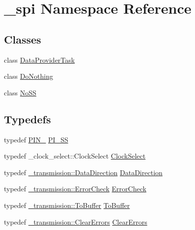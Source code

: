\hypertarget{namespace__spi}{}\section{\+\_\+spi Namespace Reference}
\label{namespace__spi}
\subsection*{Classes}
\begin{DoxyCompactItemize}
\item 
class \hyperlink{class__spi_1_1DataProviderTask}{Data\+Provider\+Task}
\item 
class \hyperlink{class__spi_1_1DoNothing}{Do\+Nothing}
\item 
class \hyperlink{class__spi_1_1NoSS}{No\+SS}
\end{DoxyCompactItemize}
\subsection*{Typedefs}
\begin{DoxyCompactItemize}
\item 
typedef \hyperlink{ports_8h_a7a6229aeb00e502b02a6c6326d917ac3}{P\+I\+N\+\_} \hyperlink{namespace__spi_a434315d1279c8f510156c8a5fc878ac7}{P\+I\+\_\+\+SS}
\item 
typedef \+\_\+clock\+\_\+select\+::\+Clock\+Select \hyperlink{namespace__spi_af65fa4a6f5d6ab0ac870066fdf89cccb}{Clock\+Select}
\item 
typedef \hyperlink{namespace__transmission_a49a33659d7c6abcf7f0180cd7e34fa0e}{\+\_\+transmission\+::\+Data\+Direction} \hyperlink{namespace__spi_ac38499e87a8df9fd49f1becb09f847d2}{Data\+Direction}
\item 
typedef \hyperlink{namespace__transmission_aea6508744dac6029815eb3aac4affda8}{\+\_\+transmission\+::\+Error\+Check} \hyperlink{namespace__spi_aa004e3fbc2eb239fc900cb843aad51a2}{Error\+Check}
\item 
typedef \hyperlink{namespace__transmission_a43fedd4787676a3bbd1a35dbfa138f06}{\+\_\+transmission\+::\+To\+Buffer} \hyperlink{namespace__spi_aa6a43ffb968de9f9a86b6f1208fc6a12}{To\+Buffer}
\item 
typedef \hyperlink{class__transmission_1_1ClearErrors}{\+\_\+transmission\+::\+Clear\+Errors} \hyperlink{namespace__spi_a7f84bc62e06fdda021c42411ad8eee2a}{Clear\+Errors}
\end{DoxyCompactItemize}
